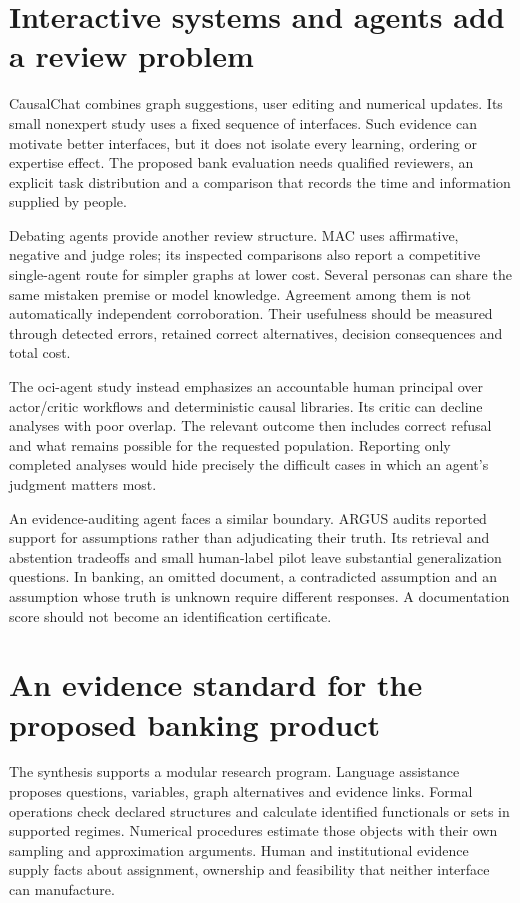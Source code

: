 \section{Interactive systems and agents add a review problem}

CausalChat combines graph suggestions, user editing and numerical updates.
Its small nonexpert study uses a fixed sequence of interfaces.
\cite{v12_la_2410_14146} Such evidence can motivate better interfaces, but it does
not isolate every learning, ordering or expertise effect. The proposed bank
evaluation needs qualified reviewers, an explicit task distribution and a
comparison that records the time and information supplied by people.

Debating agents provide another review structure. MAC uses affirmative,
negative and judge roles; its inspected comparisons also report a competitive
single-agent route for simpler graphs at lower cost.\cite{v12_la_2407_15073}
Several personas can share the same mistaken premise or model knowledge.
Agreement among them is not automatically independent corroboration. Their
usefulness should be measured through detected errors, retained correct
alternatives, decision consequences and total cost.

The oci-agent study instead emphasizes an accountable human principal over
actor/critic workflows and deterministic causal libraries. Its critic can
decline analyses with poor overlap.\cite{v12_la_2607_22443} The relevant outcome
then includes correct refusal and what remains possible for the requested
population. Reporting only completed analyses would hide precisely the
difficult cases in which an agent's judgment matters most.

An evidence-auditing agent faces a similar boundary. ARGUS audits reported
support for assumptions rather than adjudicating their truth. Its retrieval
and abstention tradeoffs and small human-label pilot leave substantial
generalization questions.\cite{v12_la_2609_30867} In banking, an omitted document,
a contradicted assumption and an assumption whose truth is unknown require
different responses. A documentation score should not become an identification
certificate.

\section{An evidence standard for the proposed banking product}

The synthesis supports a modular research program. Language assistance proposes
questions, variables, graph alternatives and evidence links. Formal operations
check declared structures and calculate identified functionals or sets in
supported regimes. Numerical procedures estimate those objects with their own
sampling and approximation arguments. Human and institutional evidence supply
facts about assignment, ownership and feasibility that neither interface can
manufacture.

